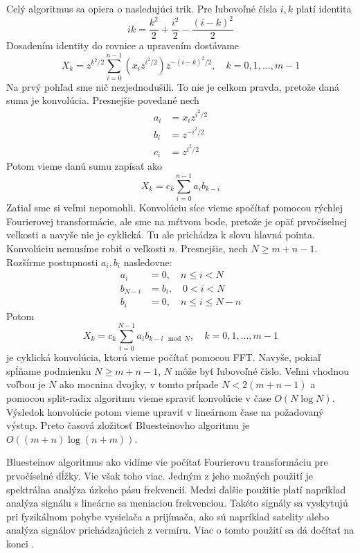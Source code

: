 Celý algoritmus sa opiera o nasledujúci trik. Pre ľubovoľné čísla
$i,k$ platí identita
\begin{equation}
    ik = \frac{k^2}{2} + \frac{i^2}{2} - \frac{(i-k)^2}{2}
\end{equation}
Dosadením identity do rovnice a upravením dostávame
\begin{equation}
    X_k = z^{k^2/2}
        \sum_{i=0}^{n-1} 
            \left(x_i z^{i^2/2} \right)
            z^{-(i-k)^2/2}
        , \quad k = 0,1,\dots,m-1
\end{equation}
Na prvý pohľad sme nič nezjednodušili. To nie je celkom pravda,
pretože daná suma je konvolúcia. Presnejšie povedané nech
\begin{align}
    a_i &= x_i z^{i^2/2} \\
    b_i &= z^{-i^2/2} \\
    c_i &= z^{i^2/2}
\end{align}
Potom vieme danú sumu zapísať ako
\begin{equation}
    X_k = c_k \sum_{i=0}^{n-1} a_i b_{k-i}
\end{equation}
Zaťiaľ sme si veľmi nepomohli. Konvolúciu síce vieme spočítať pomocou
rýchlej Fourierovej transformácie, ale sme na mŕtvom bode, pretože
je opäť prvočíselnej veľkosti a navyše nie je cyklická. 
Tu ale prichádza k slovu hlavná pointa.
Konvolúciu nemusíme robiť o veľkosti $n$.
Presnejšie, nech $N\ge m+n -1$.
Rozšírme postupnosti $a_i,b_i$ nasledovne:
\begin{align}
    a_i &=0, \quad n\le i<N \\
    b_{N-i} &= b_{i}, \quad 0 < i < N \\
    b_i &= 0, \quad n\le i \le N-n
\end{align}
Potom
\begin{equation}
    X_k = c_k \sum_{i=0}^{N-1} a_i b_{k-i \mod N},
        \quad k = 0,1,\dots,m-1
\end{equation}
je cyklická konvolúcia, ktorú vieme počítať pomocou FFT.
Navyše, pokiaľ spĺňame podmienku $N\ge m+n-1$, $N$ môže byť ľubovoľné
číslo. Veľmi vhodnou voľbou je $N$ ako mocnina dvojky, v tomto prípade
$N < 2(m+n-1)$ a pomocou split-radix algoritmu vieme spraviť
konvolúcie v čase $O(N \log N)$.
Výsledok konvolúcie potom vieme upraviť v lineárnom čase na požadovaný
výstup. Preto časová zložitosť Bluesteinovho algoritmu je
$O( (m+n) \log (n+m))$.



Bluesteinov algoritmus ako vidíme vie počítať Fourierovu transformáciu
pre prvočíselné dĺžky. Vie však toho viac. Jedným z jeho možných
použití je spektrálna analýza úzkeho pásu frekvencií.
Medzi ďalšie použitie platí napríklad analýza signálu s lineárne sa
meniaciou frekvenciou. Takéto signály sa vyskytujú pri fyzikálnom
pohybe vysielača a prijímača, ako sú napríklad satelity alebo analýza
signálov prichádzajúcich z vermíru. Viac o tomto použití sa dá dočítať
na konci
\cite{nasa}.


